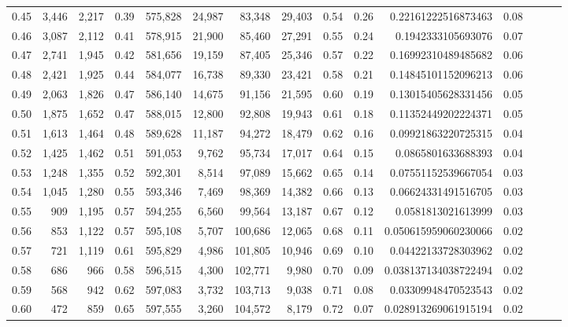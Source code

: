 \begin{tabular}{rrrrrrrrrrrrrrr}
0.45 &   3,446 &  2,217 &  0.39 &  575,828 &   24,987 &   83,348 &   29,403 &  0.54 &  0.26 &     0.22161222516873463 &      0.08 \\
0.46 &   3,087 &  2,112 &  0.41 &  578,915 &   21,900 &   85,460 &   27,291 &  0.55 &  0.24 &      0.1942333105693076 &      0.07 \\
0.47 &   2,741 &  1,945 &  0.42 &  581,656 &   19,159 &   87,405 &   25,346 &  0.57 &  0.22 &     0.16992310489485682 &      0.06 \\
0.48 &   2,421 &  1,925 &  0.44 &  584,077 &   16,738 &   89,330 &   23,421 &  0.58 &  0.21 &     0.14845101152096213 &      0.06 \\
0.49 &   2,063 &  1,826 &  0.47 &  586,140 &   14,675 &   91,156 &   21,595 &  0.60 &  0.19 &     0.13015405628331456 &      0.05 \\
0.50 &   1,875 &  1,652 &  0.47 &  588,015 &   12,800 &   92,808 &   19,943 &  0.61 &  0.18 &     0.11352449202224371 &      0.05 \\
0.51 &   1,613 &  1,464 &  0.48 &  589,628 &   11,187 &   94,272 &   18,479 &  0.62 &  0.16 &     0.09921863220725315 &      0.04 \\
0.52 &   1,425 &  1,462 &  0.51 &  591,053 &    9,762 &   95,734 &   17,017 &  0.64 &  0.15 &      0.0865801633688393 &      0.04 \\
0.53 &   1,248 &  1,355 &  0.52 &  592,301 &    8,514 &   97,089 &   15,662 &  0.65 &  0.14 &     0.07551152539667054 &      0.03 \\
0.54 &   1,045 &  1,280 &  0.55 &  593,346 &    7,469 &   98,369 &   14,382 &  0.66 &  0.13 &     0.06624331491516705 &      0.03 \\
0.55 &     909 &  1,195 &  0.57 &  594,255 &    6,560 &   99,564 &   13,187 &  0.67 &  0.12 &      0.0581813021613999 &      0.03 \\
0.56 &     853 &  1,122 &  0.57 &  595,108 &    5,707 &  100,686 &   12,065 &  0.68 &  0.11 &    0.050615959060230066 &      0.02 \\
0.57 &     721 &  1,119 &  0.61 &  595,829 &    4,986 &  101,805 &   10,946 &  0.69 &  0.10 &     0.04422133728303962 &      0.02 \\
0.58 &     686 &    966 &  0.58 &  596,515 &    4,300 &  102,771 &    9,980 &  0.70 &  0.09 &    0.038137134038722494 &      0.02 \\
0.59 &     568 &    942 &  0.62 &  597,083 &    3,732 &  103,713 &    9,038 &  0.71 &  0.08 &     0.03309948470523543 &      0.02 \\
0.60 &     472 &    859 &  0.65 &  597,555 &    3,260 &  104,572 &    8,179 &  0.72 &  0.07 &    0.028913269061915194 &      0.02 \\

\end{tabular}
